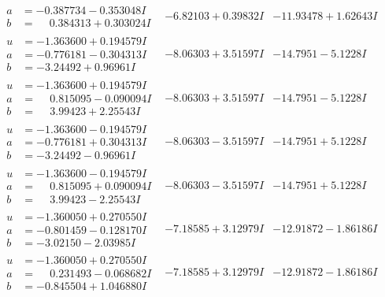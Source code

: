 \documentclass[1p]{elsarticle_modified}
\theoremstyle{definition}
\begin{document}
$$\begin{array}{c|c|c}
\begin{aligned}
a &= -0.387734 - 0.353048 I \\
b &= \phantom{-}0.384313 + 0.303024 I\end{aligned}
 & -6.82103 + 0.39832 I & -11.93478 + 1.62643 I \\ \hline\begin{aligned}
u &= -1.363600 + 0.194579 I \\
a &= -0.776181 - 0.304313 I \\
b &= -3.24492 + 0.96961 I\end{aligned}
 & -8.06303 + 3.51597 I & -14.7951 - 5.1228 I \\ \hline\begin{aligned}
u &= -1.363600 + 0.194579 I \\
a &= \phantom{-}0.815095 - 0.090094 I \\
b &= \phantom{-}3.99423 + 2.25543 I\end{aligned}
 & -8.06303 + 3.51597 I & -14.7951 - 5.1228 I \\ \hline\begin{aligned}
u &= -1.363600 - 0.194579 I \\
a &= -0.776181 + 0.304313 I \\
b &= -3.24492 - 0.96961 I\end{aligned}
 & -8.06303 - 3.51597 I & -14.7951 + 5.1228 I \\ \hline\begin{aligned}
u &= -1.363600 - 0.194579 I \\
a &= \phantom{-}0.815095 + 0.090094 I \\
b &= \phantom{-}3.99423 - 2.25543 I\end{aligned}
 & -8.06303 - 3.51597 I & -14.7951 + 5.1228 I \\ \hline\begin{aligned}
u &= -1.360050 + 0.270550 I \\
a &= -0.801459 - 0.128170 I \\
b &= -3.02150 - 2.03985 I\end{aligned}
 & -7.18585 + 3.12979 I & -12.91872 - 1.86186 I \\ \hline\begin{aligned}
u &= -1.360050 + 0.270550 I \\
a &= \phantom{-}0.231493 - 0.068682 I \\
b &= -0.845504 + 1.046880 I\end{aligned}
 & -7.18585 + 3.12979 I & -12.91872 - 1.86186 I \\ \hline\begin{aligned}

\end{aligned}
\end{array}$$
\end{document}
